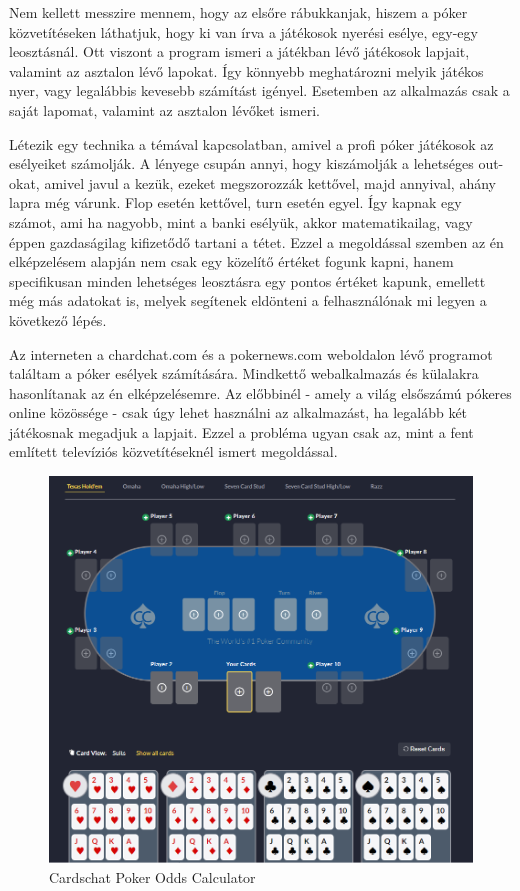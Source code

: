 Nem kellett messzire mennem, hogy az elsőre rábukkanjak, hiszem a póker közvetítéseken láthatjuk, hogy ki van írva a játékosok nyerési esélye, egy-egy leosztásnál. Ott viszont a program ismeri a játékban lévő játékosok lapjait, valamint az asztalon lévő lapokat. Így könnyebb meghatározni melyik játékos nyer, vagy legalábbis kevesebb számítást igényel. Esetemben az alkalmazás csak a saját lapomat, valamint az asztalon lévőket ismeri.

Létezik egy technika a témával kapcsolatban, amivel a profi póker játékosok az esélyeiket számolják. A lényege csupán annyi, hogy kiszámolják a lehetséges out-okat, amivel javul a kezük, ezeket megszorozzák kettővel, majd annyival, ahány lapra még várunk. Flop esetén kettővel, turn esetén egyel. Így kapnak egy számot, ami ha nagyobb, mint a banki esélyük, akkor matematikailag, vagy éppen gazdaságilag kifizetődő tartani a tétet. Ezzel a megoldással szemben az én elképzelésem alapján nem csak egy közelítő értéket fogunk kapni, hanem specifikusan minden lehetséges leosztásra egy pontos értéket kapunk, emellett még más adatokat is, melyek segítenek eldönteni a felhasználónak mi legyen a következő lépés.

Az interneten a chardchat.com és a pokernews.com weboldalon lévő programot találtam a póker esélyek számítására. Mindkettő webalkalmazás és külalakra hasonlítanak az én elképzelésemre. Az előbbinél - amely a világ elsőszámú pókeres online közössége - csak úgy lehet használni az alkalmazást, ha legalább két játékosnak megadjuk a lapjait. Ezzel a probléma ugyan csak az, mint a fent említett televíziós közvetítéseknél ismert megoldással.

\begin{figure}[h!]
\centering
\includegraphics[scale=0.6]{images/cardschat.png}
\caption{Cardschat Poker Odds Calculator}
\label{fig:cardschat}
\end{figure}

